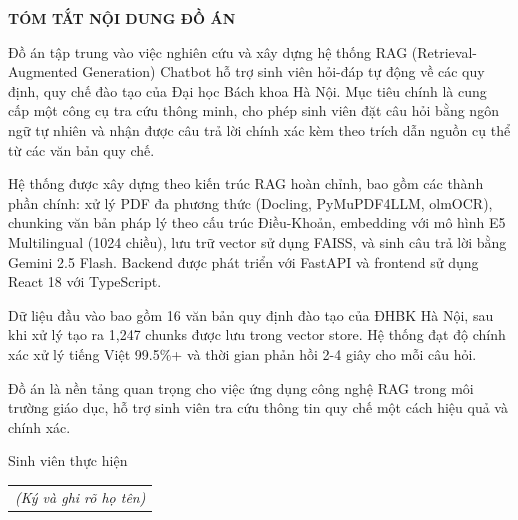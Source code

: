 \documentclass[../DoAn.tex]{subfiles}
\begin{document}
\begin{center}
    \Large{\textbf{TÓM TẮT NỘI DUNG ĐỒ ÁN}}\\
\end{center}
\vspace{1cm}
Đồ án tập trung vào việc nghiên cứu và xây dựng hệ thống RAG (Retrieval-Augmented Generation) Chatbot hỗ trợ sinh viên hỏi-đáp tự động về các quy định, quy chế đào tạo của Đại học Bách khoa Hà Nội. Mục tiêu chính là cung cấp một công cụ tra cứu thông minh, cho phép sinh viên đặt câu hỏi bằng ngôn ngữ tự nhiên và nhận được câu trả lời chính xác kèm theo trích dẫn nguồn cụ thể từ các văn bản quy chế.

Hệ thống được xây dựng theo kiến trúc RAG hoàn chỉnh, bao gồm các thành phần chính: xử lý PDF đa phương thức (Docling, PyMuPDF4LLM, olmOCR), chunking văn bản pháp lý theo cấu trúc Điều-Khoản, embedding với mô hình E5 Multilingual (1024 chiều), lưu trữ vector sử dụng FAISS, và sinh câu trả lời bằng Gemini 2.5 Flash. Backend được phát triển với FastAPI và frontend sử dụng React 18 với TypeScript.

Dữ liệu đầu vào bao gồm 16 văn bản quy định đào tạo của ĐHBK Hà Nội, sau khi xử lý tạo ra 1,247 chunks được lưu trong vector store. Hệ thống đạt độ chính xác xử lý tiếng Việt 99.5\%+ và thời gian phản hồi 2-4 giây cho mỗi câu hỏi.

Đồ án là nền tảng quan trọng cho việc ứng dụng công nghệ RAG trong môi trường giáo dục, hỗ trợ sinh viên tra cứu thông tin quy chế một cách hiệu quả và chính xác.

\begin{flushright}
Sinh viên thực hiện\\
\begin{tabular}{@{}c@{}}
\textit{(Ký và ghi rõ họ tên)}
\end{tabular}
\end{flushright}
\end{document}

